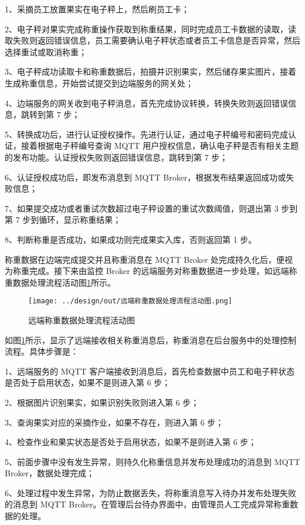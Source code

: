 1、采摘员工放置果实在电子秤上，然后刷员工卡；

2、电子秤对果实完成称重操作获取到称重结果，同时完成员工卡数据的读取，读取失败则返回错误信息，员工需要确认电子秤状态或者员工卡信息是否异常，然后选择重试或取消称重；

3、电子秤成功读取卡和称重数据后，拍摄并识别果实，然后储存果实图片，接着生成称重信息，开始尝试提交到边端服务的网关处；

4、边端服务的网关收到电子秤消息，首先完成协议转换，转换失败则返回错误信息，跳转到第 7 步；

5、转换成功后，进行认证授权操作。先进行认证，通过电子秤编号和密码完成认证，接着根据电子秤编号查询 MQTT 用户授权信息，确认电子秤是否有相关主题的发布功能。认证授权失败则返回错误信息，跳转到第 7 步；

6、认证授权成功后，即发布消息到 MQTT Broker，根据发布结果返回成功或失败信息；

7、如果提交成功或者重试次数超过电子秤设置的重试次数阈值，则退出第 3 步到第 7 步到循环，显示称重结果；

8、判断称重是否成功，如果成功则完成果实入库，否则返回第 1 步。

称重数据在边端完成提交并且称重消息在 MQTT Broker 处完成持久化后，便视为称重完成。接下来由监控 Broker 的远端服务对称重数据进一步处理，如远端称重数据处理流程活动图\ref{fig:远端称重数据处理流程活动图}所示。

\begin{figure}[H]
    \centering
    \texttt{[image: ../design/out/远端称重数据处理流程活动图.png]}
    \caption{远端称重数据处理流程活动图}
    \label{fig:远端称重数据处理流程活动图}
\end{figure}

如图\ref{fig:远端称重数据处理流程活动图}所示，显示了远端接收相关称重消息后，称重消息在后台服务中的处理控制流程。具体步骤是：

1、远端服务的 MQTT 客户端接收到消息后，首先检查数据中员工和电子秤状态是否处于启用状态，如果不是则进入第 6 步；

2、根据图片识别果实，如果识别失败则进入第 6 步；

3、查询果实对应的采摘作业，如果不存在，则进入第 6 步；

4、检查作业和果实状态是否处于启用状态，如果不是则进入第 6 步；

5、前面步骤中没有发生异常，则持久化称重信息并发布处理成功的消息到 MQTT Broker，数据处理完成；

6、处理过程中发生异常，为防止数据丢失，将称重消息写入待办并发布处理失败的消息到 MQTT Broker。在管理后台待办界面中，由管理员人工完成异常称重数据的处理。

